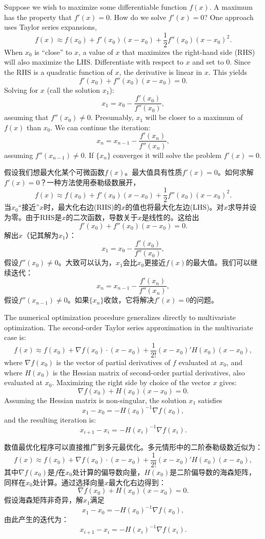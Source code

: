 \begin{original}
Suppose we wish to maximize some differentiable function $f(x)$. A maximum has the property that $f'(x) = 0$. How do we solve $f'(x) = 0$? One approach uses Taylor series expansions,
\[
f(x) \approx f(x_0) + f'(x_0)(x - x_0) + \frac{1}{2}f''(x_0)(x - x_0)^2.
\]
When $x_0$ is ``close'' to $x$, a value of $x$ that maximizes the right-hand side (RHS) will also maximize the LHS. Differentiate with respect to $x$ and set to 0. Since the RHS is a quadratic function of $x$, the derivative is linear in $x$. This yields
\[
f'(x_0) + f''(x_0)(x - x_0) = 0.
\]
Solving for $x$ (call the solution $x_1$):
\[
x_1 = x_0 - \frac{f'(x_0)}{f''(x_0)},
\]
assuming that $f''(x_0) \ne 0$. Presumably, $x_1$ will be closer to a maximum of $f(x)$ than $x_0$. We can continue the iteration:
\[
x_{n} = x_{n-1} - \frac{f'(x_{n})}{f''(x_{n})},
\]
assuming $f''(x_{n-1}) \ne 0$. If $\{x_n\}$ converges it will solve the problem $f'(x) = 0$.
\end{original}
\begin{translation}
假设我们想最大化某个可微函数$f(x)$。最大值具有性质$f'(x) = 0$。如何求解$f'(x) = 0$？一种方法使用泰勒级数展开，
\[
f(x) \approx f(x_0) + f'(x_0)(x - x_0) + \frac{1}{2}f''(x_0)(x - x_0)^2.
\]
当$x_0$``接近''$x$时，最大化右边(RHS)的$x$的值也将最大化左边(LHS)。对$x$求导并设为零。由于RHS是$x$的二次函数，导数关于$x$是线性的。这给出
\[
f'(x_0) + f''(x_0)(x - x_0) = 0.
\]
解出$x$（记其解为$x_1$）：
\[
x_1 = x_0 - \frac{f'(x_0)}{f''(x_0)},
\]
假设$f''(x_0) \ne 0$。大致可以认为，$x_1$会比$x_0$更接近$f(x)$的最大值。我们可以继续迭代：
\[
x_{n} = x_{n-1} - \frac{f'(x_{n})}{f''(x_{n})},
\]
假设$f''(x_{n-1}) \ne 0$。如果$\{x_n\}$收敛，它将解决$f'(x) = 0$的问题。
\end{translation}

\begin{original}
The numerical optimization procedure generalizes directly to multivariate optimization. The second-order Taylor series approximation in the multivariate case is:
\[
f(x) \approx f(x_0) + \nabla f(x_0) \cdot (x - x_0) + \frac{1}{2!}(x - x_0)' H(x_0)(x - x_0),
\]
where $\nabla f(x_0)$ is the vector of partial derivatives of $f$ evaluated at $x_0$, and where $H(x_0)$ is the Hessian matrix of second-order partial derivatives, also evaluated at $x_0$. Maximizing the right side by choice of the vector $x$ gives:
\[
\nabla f(x_0) + H(x_0)(x - x_0) = 0.
\]
Assuming the Hessian matrix is non-singular, the solution $x_1$ satisfies
\[
x_1 - x_0 = -H(x_0)^{-1}\nabla f(x_0),
\]
and the resulting iteration is:
\[
x_{i+1} - x_i = -H(x_i)^{-1}\nabla f(x_i).
\]
\end{original}
\begin{translation}
数值最优化程序可以直接推广到多元最优化。多元情形中的二阶泰勒级数近似为：
\[
f(x) \approx f(x_0) + \nabla f(x_0) \cdot (x - x_0) + \frac{1}{2!}(x - x_0)' H(x_0)(x - x_0),
\]
其中$\nabla f(x_0)$是$f$在$x_0$处计算的偏导数向量，$H(x_0)$是二阶偏导数的海森矩阵，同样在$x_0$处计算。通过选择向量$x$最大化右边得到：
\[
\nabla f(x_0) + H(x_0)(x - x_0) = 0.
\]
假设海森矩阵非奇异，解$x_1$满足
\[
x_1 - x_0 = -H(x_0)^{-1}\nabla f(x_0),
\]
由此产生的迭代为：
\[
x_{i+1} - x_i = -H(x_i)^{-1}\nabla f(x_i).
\]
\end{translation}

